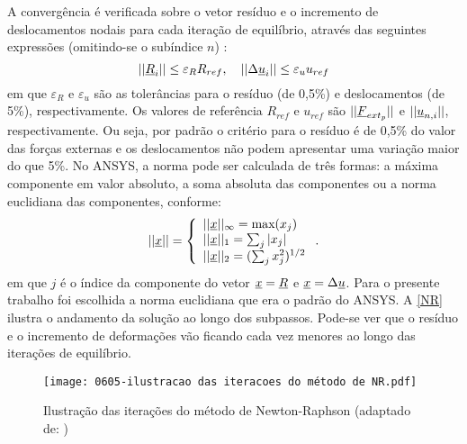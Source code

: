 A convergência é verificada sobre o vetor resíduo e o incremento de deslocamentos nodais para cada iteração de equilíbrio, através das seguintes expressões (omitindo-se o subíndice $n$) \cite[p. 667]{ANSYS2018}:
\begin{equation}
	\label{eq:convergencia}
	||\underline{R}_i|| \leq \varepsilon_R R_{ref},~~~ ||\Delta \underline u_i || \leq \varepsilon_u u_{ref}
\end{equation}
em que $\varepsilon_R$ e $\varepsilon_u$ são as tolerâncias para o resíduo (de 0,5\%) e deslocamentos (de 5\%), respectivamente. Os valores de referência $R_{ref}$ e $u_{ref}$ são $||\underline{F}_{ext_p}||$ e $||\underline u_{n,i}||$, respectivamente. Ou seja, por padrão o critério para o resíduo é de 0,5\% do valor das forças externas e os deslocamentos não podem apresentar uma variação maior do que 5\%. No ANSYS, a norma pode ser calculada de três formas: a máxima componente em valor absoluto, a soma absoluta das componentes ou a norma euclidiana das componentes, conforme:
\begin{equation}
	\label{eq:jacobiano_transformacao}
	||\underline x|| = \left\{
	\begin{array}{lcl}
		||\underline x||_\infty = \text{max}(x_j) \\
		||\underline x||_1 = \sum_{j}|x_j| \\
		||\underline x||_2 = (\sum_{j}x_j^2)^{1/2}
	\end{array}
	\right..
\end{equation}
em que $j$ é o índice da componente do vetor $\underline x = \underline{R}$ e $\underline x = \Delta \underline u$. Para o presente trabalho foi escolhida a norma euclidiana que era o padrão do ANSYS. A \autoref{NR} ilustra o andamento da solução ao longo dos subpassos. Pode-se ver que o resíduo e o incremento de deformações vão ficando cada vez menores ao longo das iterações de equilíbrio.
\begin{figure}[H]
	\begin{center}
		\texttt{[image: 0605-ilustracao das iteracoes do método de NR.pdf]}
	\end{center}
	\caption{\label{NR}Ilustração das iterações do método de Newton-Raphson (adaptado de: )}
\end{figure}

